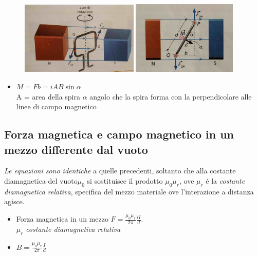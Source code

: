 \documentclass[17pt]{article}
\begin{document}
\begin{figure}[th]
\includegraphics[width=5.6cm]{motoreElettrico.jpg}
\includegraphics[width=5cm]{motoreElettrico1.jpg}
\centering%
\end{figure}

\begin{itemize}
	\item $M = Fb = iAB\sin\alpha$\\
	A = area della spira
	$\alpha$ angolo che la spira forma con la perpendicolare alle linee di campo magnetico
\end{itemize}


\subsection{Forza magnetica e campo magnetico in un mezzo differente dal vuoto}

\emph{Le equazioni sono identiche} a quelle precedenti, soltanto che alla costante diamagnetica del vuoto$\mu_0$ si sostituisce il prodotto $\mu_0\mu_r$, ove $\mu_r$ \'e la \emph{costante diamagnetica relativa}, specifica del mezzo materiale ove l'interazione a distanza agisce.


\begin{itemize}
	\item Forza magnetica in un mezzo $F = \frac{\mu_0\mu_r}{2\pi} \frac{iI}{d}$.\\ $\mu_r$ \emph{costante diamagnetica relativa}
	\item $B = \frac{\mu_0\mu_r}{2\pi} \frac{I}{d}$
\end{itemize}
\end{document}
